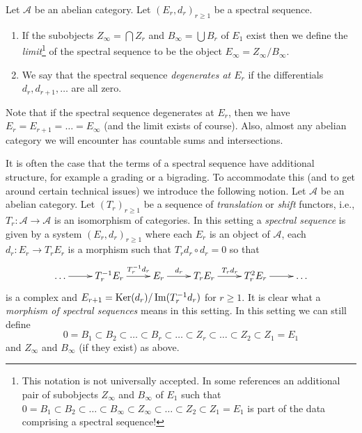 \begin{definition}
\label{definition-limit-spectral-sequence}
Let $\mathcal{A}$ be an abelian category.
Let $(E_r, d_r)_{r \geq 1}$ be a spectral sequence.
\begin{enumerate}
\item If the subobjects $Z_{\infty} = \bigcap Z_r$
and $B_{\infty} = \bigcup B_r$ of $E_1$ exist then we define
the {\it limit}\footnote{This notation is not universally accepted. In some
references an additional pair of subobjects
$Z_\infty$ and $B_\infty$ of $E_1$ such that
$0 = B_1 \subset B_2 \subset \ldots \subset B_\infty \subset Z_\infty
\subset \ldots \subset Z_2 \subset Z_1 = E_1$
is part of the data comprising a spectral sequence!}
of the spectral sequence to be the object
$E_{\infty} = Z_{\infty}/B_{\infty}$.
\item We say that the spectral sequence {\it degenerates at $E_r$}
if the differentials $d_r, d_{r + 1}, \ldots$ are all zero.
\end{enumerate}
\end{definition}

\noindent
Note that if the spectral sequence degenerates at $E_r$, then
we have $E_r = E_{r + 1} = \ldots = E_{\infty}$ (and the limit
exists of course). Also, almost any abelian category we will encounter
has countable sums and intersections.

\begin{remark}[Variant]
\label{remark-allow-translation-functors}
It is often the case that the terms of a spectral sequence have
additional structure, for example a grading or a bigrading.
To accommodate this (and to get around certain technical issues)
we introduce the following notion. Let $\mathcal{A}$ be an
abelian category. Let $(T_r)_{r \geq 1}$ be a
sequence of {\it translation} or {\it shift} functors, i.e.,
$T_r : \mathcal{A} \to \mathcal{A}$ is an isomorphism of categories.
In this setting a {\it spectral sequence} is given by a system
$(E_r, d_r)_{r \geq 1}$ where each $E_r$ is an object of
$\mathcal{A}$, each $d_r : E_r \to T_rE_r$
is a morphism such that $T_rd_r \circ d_r = 0$ so that
$$
\xymatrix{
\ldots \ar[r] &
T_r^{-1}E_r \ar[r]^-{T_r^{-1}d_r} &
E_r \ar[r]^-{d_r} &
T_rE_r \ar[r]^{T_r d_r} &
T_r^2E_r \ar[r] & \ldots
}
$$
is a complex and $E_{r + 1} = \mathop{\mathrm{Ker}}(d_r)/\mathop{\mathrm{Im}}(T_r^{-1}d_r)$ for $r \geq 1$.
It is clear what a {\it morphism of spectral sequences}
means in this setting. In this setting we can still define
$$
0 = B_1 \subset B_2 \subset \ldots \subset B_r \subset \ldots
\subset Z_r \subset \ldots \subset Z_2 \subset Z_1 = E_1
$$
and $Z_\infty$ and $B_\infty$ (if they exist) as above.
\end{remark}










